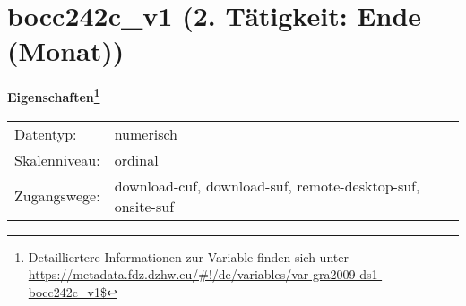
    \setcounter{footnote}{0}

    \vspace*{-1.8cm}
	\section{bocc242c\_v1 (2. Tätigkeit: Ende (Monat))}
	\label{section:bocc242c_v1}



    \vspace*{0.5cm}
    \noindent\textbf{Eigenschaften\footnote{Detailliertere Informationen zur Variable finden sich unter
		\url{https://metadata.fdz.dzhw.eu/\#!/de/variables/var-gra2009-ds1-bocc242c_v1$}}}\\
	\begin{tabularx}{\hsize}{@{}lX}
	Datentyp: & numerisch \\
	Skalenniveau: & ordinal \\
	Zugangswege: &
	  download-cuf, 
	  download-suf, 
	  remote-desktop-suf, 
	  onsite-suf
 \\
    \end{tabularx}



